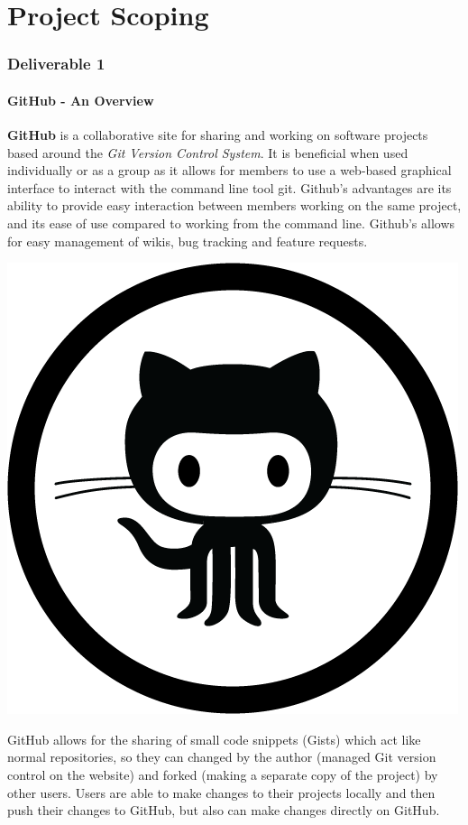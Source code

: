 \documentclass[12pt]{article}
\begin{document}
\part{Project Scoping}
\setcounter{section}{1}
\setcounter{subsection}{0}
\section*{Deliverable 1}
\subsection{GitHub - An Overview}
\textbf{GitHub} is a collaborative site for sharing and working on software projects based around the \textit{Git Version Control System}. It is beneficial when used individually or as a group as it allows for members to use a web-based graphical interface to interact with the command line tool git. Github's advantages are its ability to provide easy interaction between members working on the same project, and its ease of use compared to working from the command line. Github's allows for easy management of wikis, bug tracking and feature requests.
\begin{center}
\includegraphics[scale=0.15]{github_icon}
\end{center}
GitHub allows for the sharing of small code snippets (Gists) which act like normal repositories, so they can changed by the author (managed Git version control on the website) and forked (making a separate copy of the project) by other users. Users are able to make changes to their projects locally and then push their changes to GitHub, but also can make changes directly on GitHub.
\end{document}
